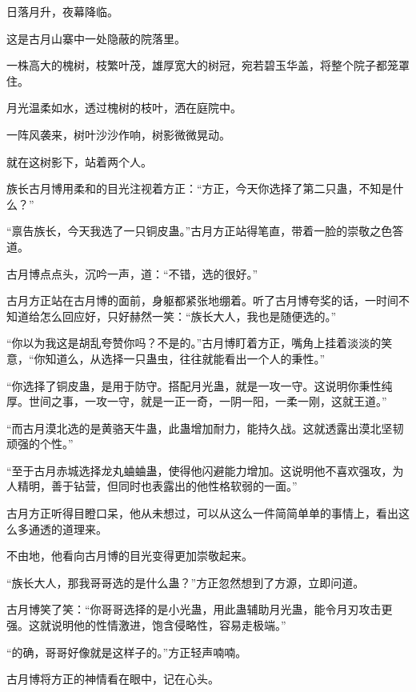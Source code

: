 
\begin{this_body}



日落月升，夜幕降临。

这是古月山寨中一处隐蔽的院落里。

一株高大的槐树，枝繁叶茂，雄厚宽大的树冠，宛若碧玉华盖，将整个院子都笼罩住。

月光温柔如水，透过槐树的枝叶，洒在庭院中。

一阵风袭来，树叶沙沙作响，树影微微晃动。

就在这树影下，站着两个人。

族长古月博用柔和的目光注视着方正：“方正，今天你选择了第二只蛊，不知是什么？”

“禀告族长，今天我选了一只铜皮蛊。”古月方正站得笔直，带着一脸的崇敬之色答道。

古月博点点头，沉吟一声，道：“不错，选的很好。”

古月方正站在古月博的面前，身躯都紧张地绷着。听了古月博夸奖的话，一时间不知道给怎么回应好，只好赫然一笑：“族长大人，我也是随便选的。”

“你以为我这是胡乱夸赞你吗？不是的。”古月博盯着方正，嘴角上挂着淡淡的笑意，“你知道么，从选择一只蛊虫，往往就能看出一个人的秉性。”

“你选择了铜皮蛊，是用于防守。搭配月光蛊，就是一攻一守。这说明你秉性纯厚。世间之事，一攻一守，就是一正一奇，一阴一阳，一柔一刚，这就王道。”

“而古月漠北选的是黄骆天牛蛊，此蛊增加耐力，能持久战。这就透露出漠北坚韧顽强的个性。”

“至于古月赤城选择龙丸蛐蛐蛊，使得他闪避能力增加。这说明他不喜欢强攻，为人精明，善于钻营，但同时也表露出的他性格软弱的一面。”

古月方正听得目瞪口呆，他从未想过，可以从这么一件简简单单的事情上，看出这么多通透的道理来。

不由地，他看向古月博的目光变得更加崇敬起来。

“族长大人，那我哥哥选的是什么蛊？”方正忽然想到了方源，立即问道。

古月博笑了笑：“你哥哥选择的是小光蛊，用此蛊辅助月光蛊，能令月刃攻击更强。这就说明他的性情激进，饱含侵略性，容易走极端。”

“的确，哥哥好像就是这样子的。”方正轻声喃喃。

古月博将方正的神情看在眼中，记在心头。


\end{this_body}

